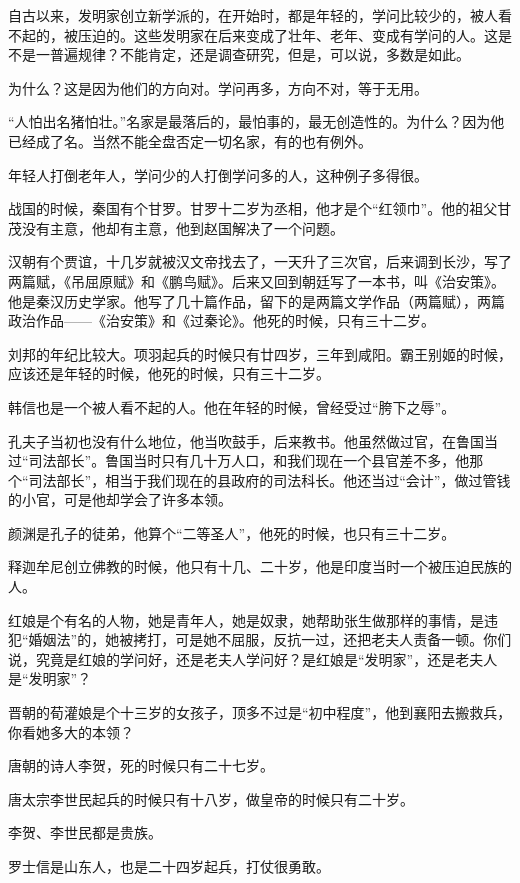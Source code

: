 自古以来，发明家创立新学派的，在开始时，都是年轻的，学问比较少的，被人看不起的，被压迫的。这些发明家在后来变成了壮年、老年、变成有学问的人。这是不是一普遍规律？不能肯定，还是调查研究，但是，可以说，多数是如此。

为什么？这是因为他们的方向对。学问再多，方向不对，等于无用。

“人怕出名猪怕壮。”名家是最落后的，最怕事的，最无创造性的。为什么？因为他已经成了名。当然不能全盘否定一切名家，有的也有例外。

年轻人打倒老年人，学问少的人打倒学问多的人，这种例子多得很。

战国的时候，秦国有个甘罗。甘罗十二岁为丞相，他才是个“红领巾”。他的祖父甘茂没有主意，他却有主意，他到赵国解决了一个问题。

汉朝有个贾谊，十几岁就被汉文帝找去了，一天升了三次官，后来调到长沙，写了两篇赋，《吊屈原赋》和《鹏鸟赋》。后来又回到朝廷写了一本书，叫《治安策》。他是秦汉历史学家。他写了几十篇作品，留下的是两篇文学作品（两篇赋），两篇政治作品——《治安策》和《过秦论》。他死的时候，只有三十二岁。

刘邦的年纪比较大。项羽起兵的时候只有廿四岁，三年到咸阳。霸王别姬的时候，应该还是年轻的时候，他死的时候，只有三十二岁。

韩信也是一个被人看不起的人。他在年轻的时候，曾经受过“胯下之辱”。

孔夫子当初也没有什么地位，他当吹鼓手，后来教书。他虽然做过官，在鲁国当过“司法部长”。鲁国当时只有几十万人口，和我们现在一个县官差不多，他那个“司法部长”，相当于我们现在的县政府的司法科长。他还当过“会计”，做过管钱的小官，可是他却学会了许多本领。

颜渊是孔子的徒弟，他算个“二等圣人”，他死的时候，也只有三十二岁。

释迦牟尼创立佛教的时候，他只有十几、二十岁，他是印度当时一个被压迫民族的人。

红娘是个有名的人物，她是青年人，她是奴隶，她帮助张生做那样的事情，是违犯“婚姻法”的，她被拷打，可是她不屈服，反抗一过，还把老夫人责备一顿。你们说，究竟是红娘的学问好，还是老夫人学问好？是红娘是“发明家”，还是老夫人是“发明家”？

晋朝的荀灌娘是个十三岁的女孩子，顶多不过是“初中程度”，他到襄阳去搬救兵，你看她多大的本领？

唐朝的诗人李贺，死的时候只有二十七岁。

唐太宗李世民起兵的时候只有十八岁，做皇帝的时候只有二十岁。

李贺、李世民都是贵族。

罗士信是山东人，也是二十四岁起兵，打仗很勇敢。

